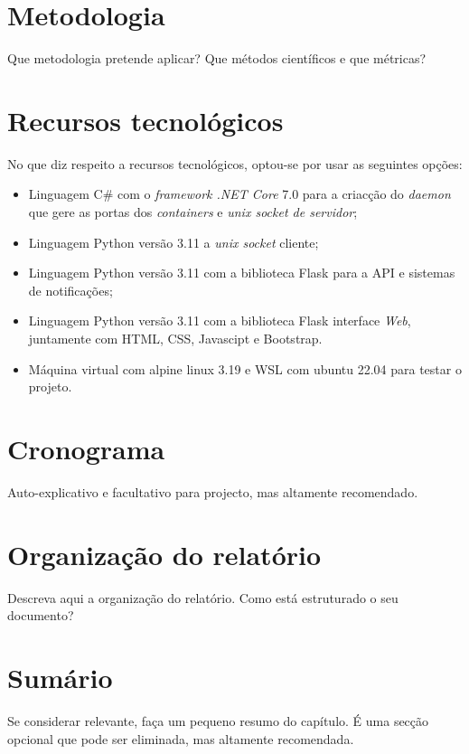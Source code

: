 \section{Metodologia}
\label{sec:intro_method}
Que metodologia pretende aplicar? Que métodos científicos e que métricas?

\section{Recursos tecnológicos}
\label{sec:intro_resources}


No que diz respeito a recursos tecnológicos, optou-se por usar as seguintes opções:

\begin{itemize}
\item Linguagem C\# com o \textit{framework .NET Core} 7.0 para a criacção do \textit{daemon} que gere
as portas dos \textit{containers} e \textit{unix socket de servidor};
\item Linguagem Python versão 3.11 a \textit{unix socket} cliente;
\item Linguagem Python versão 3.11 com a biblioteca Flask para a API e sistemas de notificações;
\item Linguagem Python versão 3.11 com a biblioteca Flask interface \textit{Web}, juntamente com HTML, CSS, Javascipt e Bootstrap.
\item Máquina virtual com alpine linux 3.19 e WSL com ubuntu 22.04 para testar o projeto.
\end{itemize}


\section{Cronograma}
\label{sec:intro_chronos}

Auto-explicativo e facultativo para projecto, mas altamente recomendado.


\section{Organização do relatório}
\label{sec:intro_struct}

Descreva aqui a organização do relatório. Como está estruturado o seu documento?

\section*{Sumário}
\label{sec:intro_summary}
Se considerar relevante, faça um pequeno resumo do capítulo. É uma secção opcional que pode ser eliminada, mas altamente recomendada.
\\
\\
\\
\\
